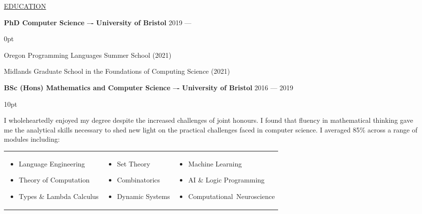\documentclass{article}
\newenvironment{tight-list}[1]{
  \vspace{5pt}
  \begin{adjustwidth}{15pt}{0pt}
  \begin{itemize}
    \setlength{\itemsep}{#1}
    \setlength{\parskip}{0pt}
    \setlength{\parsep}{0pt} 
}
{
  \end{itemize}
  \end{adjustwidth}
  \vspace{15pt}
}
\begin{document}
\uline{{\large EDUCATION}\hfill}

\vspace{10pt}

\textbf{PhD Computer Science --‐ University of Bristol} \hfill 2019 --- \phantom{ 2021}
\begin{tight-list}{0pt}
\item Oregon Programming Languages Summer School (2021)
\item Midlands Graduate School in the Foundations of Computing Science (2021)
\end{tight-list}

\textbf{BSc (Hons) Mathematics and Computer Science --‐ University of Bristol} \hfill 2016 --- 2019
\begin{tight-list}{10pt}
\item I wholeheartedly enjoyed my degree despite the increased challenges of joint honours.
I found that fluency in mathematical thinking gave me the analytical skills necessary to shed new light on the practical challenges faced in computer science.
I averaged 85\% across a range of modules including:

\begin{tabular}{p{}p{}p{}}
  \raggedright{}
  \begin{itemize}
    \item Language Engineering
    \item Theory of Computation
    \item Types \& Lambda Calculus
  \end{itemize}

   &
  \raggedright{}
  \begin{itemize}
    \item Set Theory
    \item Combinatorics
    \item Dynamic Systems
  \end{itemize}

   &
  \raggedright{}
  \begin{itemize}
    \item Machine Learning
    \item AI \& Logic Programming
    \item \mbox{Computational Neuroscience}
  \end{itemize}
\end{tabular}
\vspace{-10pt}


\end{tight-list}
\end{document}
